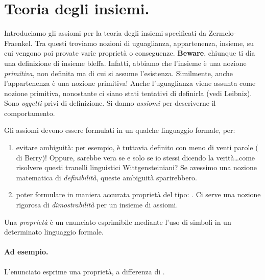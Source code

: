 \section{Teoria degli insiemi.}
Introduciamo gli assiomi per la teoria degli insiemi specificati da Zermelo-Fraenkel. Tra questi troviamo nozioni di uguaglianza, appartenenza, insieme, su cui vengono poi provate varie proprietà o conseguenze. {\bf Beware}, chiunque ti dia una definizione di insieme bleffa. Infatti, abbiamo che l'insieme è una nozione \emph{primitiva}, non definita ma di cui si assume l'esistenza. Similmente, anche l'appartenenza è una nozione primitiva! Anche l'uguaglianza viene assunta come nozione primitiva, nonostante ci siano stati tentativi di definirla (vedi Leibniz). Sono \emph{oggetti} privi di definizione. Si danno \emph{assiomi} per descriverne il comportamento.

Gli assiomi devono essere formulati in un qualche linguaggio formale, per:
\begin{enumerate}
  \item evitare ambiguità: per esempio,  è tuttavia definito con meno di venti parole ( di Berry)! Oppure,  sarebbe vera se e solo se io stessi dicendo la verità\ldots{}come risolvere questi tranelli linguistici Wittgensteiniani? Se avessimo una nozione matematica di \emph{definibilità}, queste ambiguità sparirebbero.
  \item poter formulare in maniera accurata proprietà del tipo: . Ci serve una nozione rigorosa di \emph{dimostrabilità} per un insieme di assiomi.
\end{enumerate}

  \begin{dfn}[Proprietà]
    Una \emph{proprietà} è un enunciato esprimibile mediante l'uso di simboli in un determinato linguaggio formale.
  \end{dfn}

  \paragraph{Ad esempio.} L'enunciato  esprime una proprietà, a differenza di .

